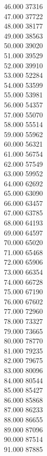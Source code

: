 { 46.000	37316 \\
 47.000	37722 \\
 48.000	38177 \\
 49.000	38563 \\
 50.000	39020 \\
 51.000	39529 \\
 52.000	39910 \\
 53.000	52284 \\
 54.000	53599 \\
 55.000	53981 \\
 56.000	54357 \\
 57.000	55070 \\
 58.000	55514 \\
 59.000	55962 \\
 60.000	56321 \\
 61.000	56754 \\
 62.000	57549 \\
 63.000	59952 \\
 64.000	62692 \\
 65.000	63090 \\
 66.000	63457 \\
 67.000	63785 \\
 68.000	64193 \\
 69.000	64597 \\
 70.000	65020 \\
 71.000	65468 \\
 72.000	65906 \\
 73.000	66354 \\
 74.000	66728 \\
 75.000	67190 \\
 76.000	67602 \\
 77.000	72960 \\
 78.000	73327 \\
 79.000	73665 \\
 80.000	78770 \\
 81.000	79235 \\
 82.000	79675 \\
 83.000	80096 \\
 84.000	80544 \\
 85.000	85427 \\
 86.000	85868 \\
 87.000	86233 \\
 88.000	86655 \\
 89.000	87096 \\
 90.000	87514 \\
 91.000	87885 \\
}
